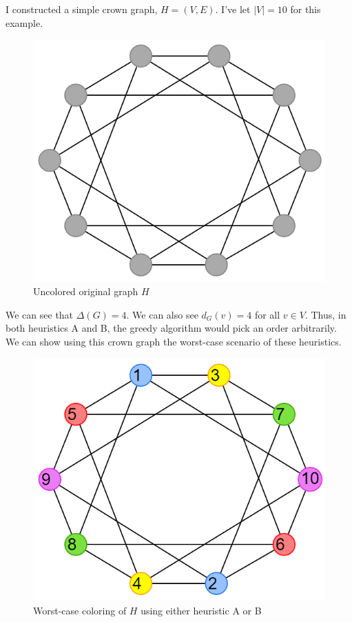 \documentclass{article}
\begin{document}
I constructed a simple crown graph, \(H = (V, E)\). I've let \(|V| = 10\) for this example.

\begin{figure}[H]
\centering
\includegraphics[scale=0.38]{images/graph-4.png}
\caption{Uncolored original graph \(H\)}
\end{figure}

We can see that \(\Delta(G) = 4\). We can also see \(d_G(v) = 4\) for all \(v \in V\). Thus, in both heuristics A and B, the greedy algorithm would pick an order arbitrarily. We can show using this crown graph the worst-case scenario of these heuristics.

\begin{figure}[H]
\centering
\includegraphics[scale=0.38]{images/graph-5.png}
\caption{Worst-case coloring of \(H\) using either heuristic A or B}
\end{figure}
\end{document}
